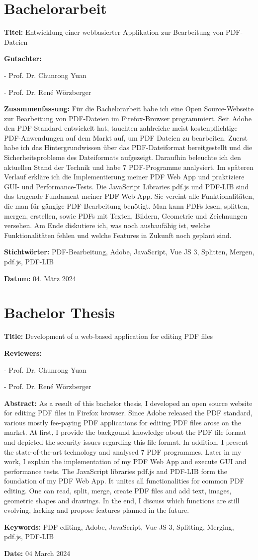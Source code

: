 \chapter*{Bachelorarbeit}
\label{chap:zusammenfassung}
%
\textbf{Titel:} Entwicklung einer webbasierter Applikation zur Bearbeitung von PDF-Dateien

\textbf{Gutachter:}
\par
- Prof. Dr. Chunrong Yuan
\par
- Prof. Dr. René Wörzberger

\textbf{Zusammenfassung:} Für die Bachelorarbeit habe ich eine Open Source-Webseite zur Bearbeitung von PDF-Dateien im Firefox-Browser programmiert. Seit Adobe den PDF-Standard entwickelt hat, tauchten zahlreiche meist kostenpflichtige PDF-Anwendungen auf dem Markt auf, um PDF Dateien zu bearbeiten. Zuerst habe ich das Hintergrundwissen über das PDF-Dateiformat bereitgestellt und die Sicherheitsprobleme des Dateiformats aufgezeigt. Daraufhin beleuchte ich den aktuellen Stand der Technik und habe 7 PDF-Programme analysiert. Im späteren Verlauf erkläre ich die Implementierung meiner PDF Web App und praktiziere GUI- und Performance-Tests. Die JavaScript Libraries pdf.js und PDF-LIB sind das tragende Fundament meiner PDF Web App. Sie vereint alle Funktionalitäten, die man für gängige PDF Bearbeitung benötigt. Man kann PDFs lesen, splitten, mergen, erstellen, sowie PDFs mit Texten, Bildern, Geometrie und Zeichnungen versehen. Am Ende diskutiere ich, was noch ausbaufähig ist, welche Funktionalitäten fehlen und welche Features in Zukunft noch geplant sind.

\textbf{Stichtwörter:} PDF-Bearbeitung, Adobe, JavaScript, Vue JS 3, Splitten, Mergen, pdf.js, PDF-LIB

\textbf{Datum:} 04. März 2024


\newpage
\chapter*{Bachelor Thesis}
\label{chap:abstract}
%
\textbf{Title:} Development of a web-based application for editing PDF files

\textbf{Reviewers:}
\par
- Prof. Dr. Chunrong Yuan
\par
- Prof. Dr. René Wörzberger

\textbf{Abstract:} As a result of this bachelor thesis, I developed an open source website for editing PDF files in Firefox browser. Since Adobe released the PDF standard, various mostly fee-paying PDF applications for editing PDF files arose on the market. At first, I provide the backgound knowledge about the PDF file format and depicted the security issues regarding this file format. In addition, I present the state-of-the-art technology and analysed 7 PDF programmes. Later in my work, I explain the implementation of my PDF Web App and execute GUI and performance tests. The JavaScript libraries pdf.js and PDF-LIB form the foundation of my PDF Web App. It unites all functionalities for common PDF editing. One can read, split, merge, create PDF files and add text, images, geometric shapes and drawings. In the end, I discuss which functions are still evolving, lacking and propose features planned in the future.

\textbf{Keywords:} PDF editing, Adobe, JavaScript, Vue JS 3, Splitting, Merging, pdf.js, PDF-LIB

\textbf{Date:} 04 March 2024